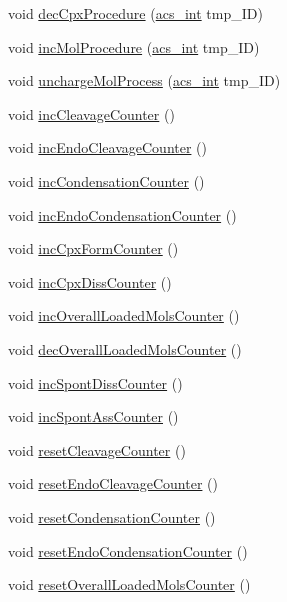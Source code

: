 \begin{DoxyCompactItemize}
void \hyperlink{a00013_a16d09f818d3012f88e8e4c9a7759b6bd}{dec\+Cpx\+Procedure} (\hyperlink{a00050_a8d277355641a098190360234e2ebde35}{acs\+\_\+int} tmp\+\_\+\+I\+D)
\item 
void \hyperlink{a00013_a094499a0f1bb3c2342a3b16944f5280d}{inc\+Mol\+Procedure} (\hyperlink{a00050_a8d277355641a098190360234e2ebde35}{acs\+\_\+int} tmp\+\_\+\+I\+D)
\item 
void \hyperlink{a00013_af21c066ce18c8a39740f66a995782fb9}{uncharge\+Mol\+Process} (\hyperlink{a00050_a8d277355641a098190360234e2ebde35}{acs\+\_\+int} tmp\+\_\+\+I\+D)
\item 
void \hyperlink{a00013_a480887ed06f63d34e014c19ea302d3d5}{inc\+Cleavage\+Counter} ()
\item 
void \hyperlink{a00013_ab0fc2cd6ed209d61286b837bd5460d90}{inc\+Endo\+Cleavage\+Counter} ()
\item 
void \hyperlink{a00013_a3fae8e57fad9ef5b182e32d9bb9989af}{inc\+Condensation\+Counter} ()
\item 
void \hyperlink{a00013_a01812d540519696ab07c9f822119cc64}{inc\+Endo\+Condensation\+Counter} ()
\item 
void \hyperlink{a00013_afd3d590aa9b6a644cb360cc5fd47e16a}{inc\+Cpx\+Form\+Counter} ()
\item 
void \hyperlink{a00013_a73f88a08ff9206e48063cccb1729ee6b}{inc\+Cpx\+Diss\+Counter} ()
\item 
void \hyperlink{a00013_a719b14624d9a2f891b8d4eb47649a00e}{inc\+Overall\+Loaded\+Mols\+Counter} ()
\item 
void \hyperlink{a00013_a6686b0489ed94f11c4b03c011978f9af}{dec\+Overall\+Loaded\+Mols\+Counter} ()
\item 
void \hyperlink{a00013_a0c22436405fc1ec79d33485c2e80d817}{inc\+Spont\+Diss\+Counter} ()
\item 
void \hyperlink{a00013_aa2632ded9c384c3183c3ebebb530e2d7}{inc\+Spont\+Ass\+Counter} ()
\item 
void \hyperlink{a00013_a0b1e324c651c86cb54279e022c14dc6d}{reset\+Cleavage\+Counter} ()
\item 
void \hyperlink{a00013_a3362d147de095640619d9b44f7f20bba}{reset\+Endo\+Cleavage\+Counter} ()
\item 
void \hyperlink{a00013_ac7deab8db2f581077da735c3542d8f1b}{reset\+Condensation\+Counter} ()
\item 
void \hyperlink{a00013_a55cff0bc2f8de4d3e4db471cad580a86}{reset\+Endo\+Condensation\+Counter} ()
\item 
void \hyperlink{a00013_abc04de785dddab4703fdcf52ccdf85f9}{reset\+Overall\+Loaded\+Mols\+Counter} ()

\end{DoxyCompactItemize}
